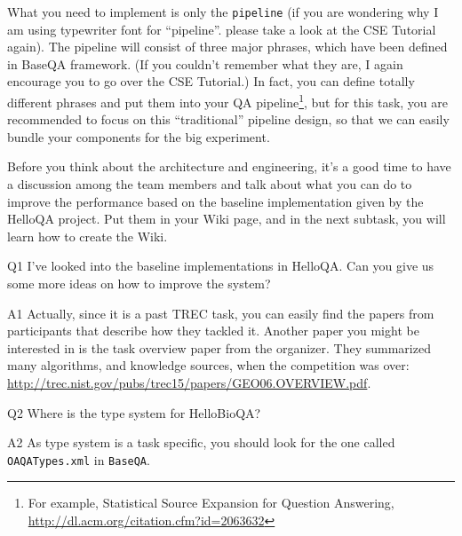 What you need to implement is only the \verb|pipeline| (if you are wondering why
I am using typewriter font for ``pipeline''. please take a look at the CSE
Tutorial again). The pipeline will consist of three major phrases, which have
been defined in BaseQA framework. (If you couldn't remember what they are, I
again encourage you to go over the CSE Tutorial.) In fact, you can define
totally different phrases and put them into your QA pipeline\footnote{For
example, Statistical Source Expansion for Question Answering,
\url{http://dl.acm.org/citation.cfm?id=2063632}}, but for this task, you are
recommended to focus on this ``traditional'' pipeline design, so that we can
easily bundle your components for the big experiment.

Before you think about the architecture and engineering, it's a good time to
have a discussion among the team members and talk about what you can do to
improve the performance based on the baseline implementation given by the
HelloQA project. Put them in your Wiki page, and in the next subtask, you will
learn how to create the Wiki.

\begin{qa}

\item[Q1] I've looked into the baseline implementations in HelloQA. Can you give
us some more ideas on how to improve the system?

\item[A1] Actually, since it is a past TREC task, you can easily find the papers
from participants that describe how they tackled it. Another paper you might be
interested in is the task overview paper from the organizer. They summarized
many algorithms, and knowledge sources, when the competition was over:
\url{http://trec.nist.gov/pubs/trec15/papers/GEO06.OVERVIEW.pdf}.

\item[Q2] Where is the type system for HelloBioQA?

\item[A2] As type system is a task specific, you should look for the one called
\texttt{OAQATypes.xml} in \texttt{BaseQA}.

\end{qa}
